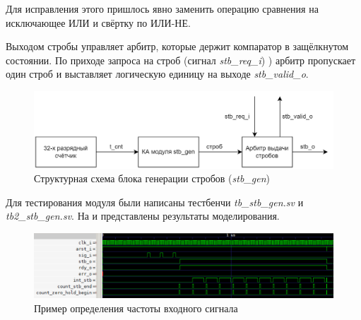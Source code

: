 \FloatBarrier

Для исправления этого пришлось явно заменить операцию сравнения на исключающее ИЛИ и свёртку по ИЛИ-НЕ.

\lstset{
	numbersep = 5pt,
	stepnumber = 1
}

Выходом стробы управляет арбитр, которые держит компаратор в защёлкнутом состоянии. По приходе запроса на строб
(сигнал \emph{stb\_req\_i}) ) арбитр пропускает один строб и выставляет логическую единицу на выходе
\emph{stb\_valid\_o}.


\begin{figure}[ht!] 
	\center
	\includegraphics [scale=0.3] {my_folder/images//stb_gen_big}
	\caption{Структурная схема блока генерации стробов (\emph{stb\_gen})} 
	\label{fig:stb-gen-big}  
\end{figure}



Для тестирования модуля были написаны тестбенчи \emph{tb\_stb\_gen.sv} и \emph{tb2\_stb\_gen.sv}. На  и 
представлены результаты моделирования.\\

\FloatBarrier

\begin{figure}[ht!] 
	\center
	\includegraphics  [scale=0.7] {my_folder/images//tb_stb_gen}
	\caption{Пример определения частоты входного сигнала} 
	\label{fig:tb-stb-gen}  
\end{figure}

